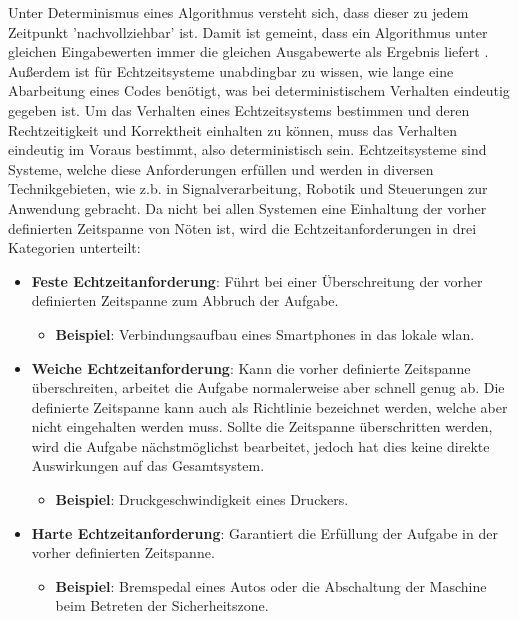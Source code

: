 \documentclass[../EDF Master Thesis.tex]{subfiles}
\begin{document}
Unter Determinismus eines Algorithmus versteht sich, dass dieser zu jedem Zeitpunkt 'nachvollziehbar' ist.
Damit ist gemeint, dass ein Algorithmus unter gleichen Eingabewerten immer die gleichen Ausgabewerte als Ergebnis liefert \autocite{determinismus}.
Außerdem ist für Echtzeitsysteme unabdingbar zu wissen, wie lange eine Abarbeitung eines Codes benötigt, was bei deterministischem Verhalten eindeutig gegeben ist. 
Um das Verhalten eines Echtzeitsystems bestimmen und deren Rechtzeitigkeit und Korrektheit einhalten zu können, muss das Verhalten eindeutig im Voraus bestimmt, also deterministisch sein.
    Echtzeitsysteme sind Systeme, welche diese Anforderungen erfüllen und werden in diversen Technikgebieten, wie z.b. in Signalverarbeitung, Robotik und Steuerungen zur Anwendung gebracht.
    Da nicht bei allen Systemen eine Einhaltung der vorher definierten Zeitspanne von Nöten ist, wird die Echtzeitanforderungen in drei Kategorien unterteilt:
    \begin{itemize}
        \item \textbf{Feste Echtzeitanforderung}: Führt bei einer Überschreitung der vorher definierten Zeitspanne zum Abbruch der Aufgabe.
            \begin{itemize}
                \item \textbf{Beispiel}: Verbindungsaufbau eines Smartphones in das lokale \ac{wlan}.
            \end{itemize}
        \item \textbf{Weiche Echtzeitanforderung}: Kann die vorher definierte Zeitspanne überschreiten, arbeitet die Aufgabe normalerweise aber schnell genug ab.
            Die definierte Zeitspanne kann auch als Richtlinie bezeichnet werden, welche aber nicht eingehalten werden muss. 
            Sollte die Zeitspanne überschritten werden, wird die Aufgabe nächstmöglichst bearbeitet, jedoch hat dies keine direkte Auswirkungen auf das Gesamtsystem.
            \begin{itemize}
                \item \textbf{Beispiel}: Druckgeschwindigkeit eines Druckers.
            \end{itemize}
        \item \textbf{Harte Echtzeitanforderung}: Garantiert die Erfüllung der Aufgabe in der vorher definierten Zeitspanne.
        \begin{itemize}
            \item \textbf{Beispiel}: Bremspedal eines Autos oder die Abschaltung der Maschine beim Betreten der Sicherheitszone.
        \end{itemize}
    \end{itemize}
\end{document}
